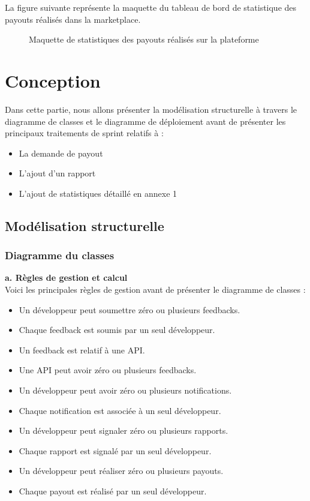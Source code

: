 La figure suivante représente la maquette du tableau de bord de statistique des payouts réalisés dans la marketplace.
\begin{figure}[H]
    \centering
    \caption{Maquette de statistiques des payouts réalisés sur la plateforme   }
    \label{fig:logo_tt}
\end{figure}
\pagebreak

\section{ Conception}
Dans cette partie, nous allons présenter la modélisation structurelle à travers le diagramme de classes et le diagramme de déploiement avant de présenter les principaux traitements de sprint relatifs à :
\begin{itemize}	
   \item La demande de payout
   \item L'ajout d'un rapport 
   \item L'ajout  de statistiques détaillé en annexe 1 
\end{itemize}
\subsection{Modélisation structurelle}
\subsubsection{Diagramme du classes}

\textbf{a. Règles de gestion et calcul} \\
Voici les principales règles de gestion avant de présenter le diagramme de classes :

    \begin{itemize}
        \item  Un développeur peut soumettre zéro ou plusieurs feedbacks.
        \item Chaque feedback est soumis par un seul développeur.
        \item Un feedback est relatif à une API.
        \item Une API peut avoir zéro ou plusieurs feedbacks.
        \item Un développeur peut avoir zéro ou plusieurs notifications.
        \item Chaque notification est associée à  un seul développeur.
        \item Un développeur peut signaler zéro ou plusieurs rapports.
        \item Chaque rapport est signalé par un seul développeur.
        \item Un développeur peut réaliser zéro ou plusieurs payouts.
        \item Chaque payout est réalisé par un seul développeur.

    \end{itemize}
\pagebreak

